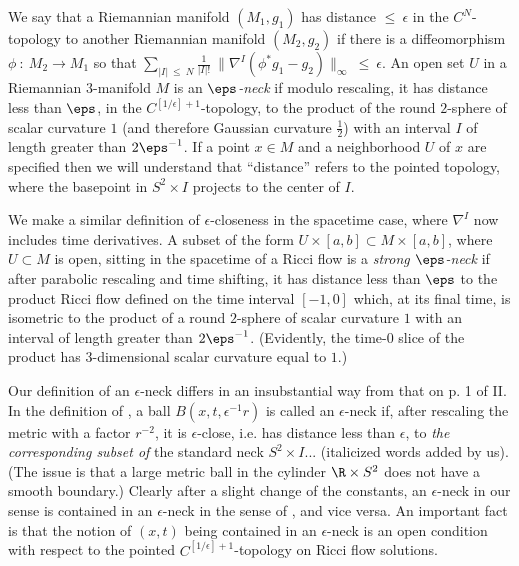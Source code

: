 \begin{definition}
  \label{def:kl-notation-terminology-smooth-closeness-epsilon-necks}
 \label{closenessdef}
We say that a Riemannian manifold
$(M_1, g_1)$ has distance $\le \: \epsilon$ in the $C^N$-topology
to another Riemannian manifold $(M_2, g_2)$ if
there is a diffeomorphism $\phi \: : \: M_2 \rightarrow M_1$ so
that $\sum_{|I| \: \le \: N} \frac{1}{|I|!} \:
\parallel \nabla^I (\phi^* g_1 - g_2) \parallel_\infty \: \le
\: \epsilon$.
An open set $U$ in a Riemannian $3$-manifold $M$ is an
{\em $\eps$-neck}
if modulo rescaling, it has
distance less than $\eps$,
in the $C^{[1/\epsilon]+1}$-topology, to the product of the
round $2$-sphere of scalar curvature $1$ (and therefore
Gaussian curvature $\frac12$)
with an interval $I$ of length
greater than
$2 \eps^{-1}$.
If a point $x \in M$ and a neighborhood $U$ of $x$ are specified then we
will understand that ``distance''
refers to the pointed topology,
where the basepoint in $S^2 \times I$ projects to the center of $I$.

We make a similar definition of $\epsilon$-closeness in the
spacetime case, where $\nabla^I$ now includes time derivatives.
A subset of the form $U\times [a,b]\subset M\times [a,b]$,
where $U\subset M$ is open, sitting
in the spacetime of a Ricci flow is a {\em strong $\eps$-neck}
if after parabolic rescaling and time shifting, it has distance less
than $\eps$ to the
product Ricci flow defined on the time
interval $[-1,0]$ which,  at its final time,
is isometric to the  product of a  round $2$-sphere of scalar
curvature $1$
with an interval of length greater than $2\eps^{-1}$. (Evidently,
the time-$0$ slice of the product has $3$-dimensional scalar curvature
equal to $1$.)
\end{definition}

Our definition of an $\epsilon$-neck
differs in an insubstantial way from that on p. 1 of II.
In the definition of \cite{Perelman2},
a ball $B(x, t, \epsilon^{-1} r)$ is called
an $\epsilon$-neck if, after rescaling the metric with a factor
$r^{-2}$, it is $\epsilon$-close,
i.e. has distance less than $\epsilon$,
to {\em the corresponding subset of}
the standard neck
$S^2 \times I$...
(italicized words added by us).
(The issue is that a large metric ball in the cylinder $\R \times S^2$
does not have a smooth boundary.)
Clearly after a slight change
of the constants, an $\epsilon$-neck in our sense is contained in an
$\epsilon$-neck in the sense of \cite{Perelman2},
and vice versa. An important fact
is that the notion of $(x, t)$ being contained in an $\epsilon$-neck
is an open condition with respect to the pointed $C^{[1/\epsilon]+1}$-topology
on Ricci flow solutions.

